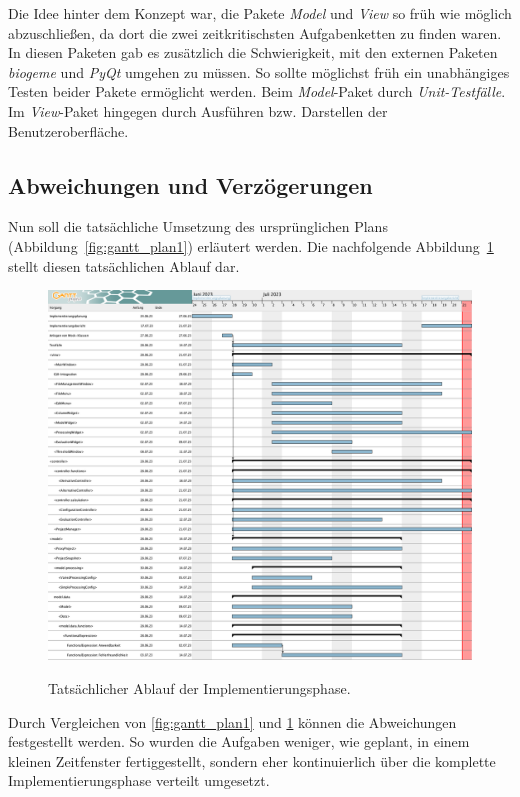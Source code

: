 \documentclass{article}
\begin{document}
Die Idee hinter dem Konzept war, die Pakete \emph{Model} und \emph{View} so früh wie möglich abzuschließen, da dort die zwei zeitkritischsten Aufgabenketten zu finden waren. In diesen Paketen gab es zusätzlich die Schwierigkeit, mit den externen Paketen \emph{\gls{biogeme}} und \emph{\gls{PyQt}} umgehen zu müssen. So sollte möglichst früh ein unabhängiges Testen beider Pakete ermöglicht werden. Beim \emph{Model}-Paket durch \emph{Unit-Testfälle}. Im \emph{View}-Paket hingegen durch Ausführen bzw. Darstellen der Benutzeroberfläche.

\subsection{Abweichungen und Verzögerungen}

Nun soll die tatsächliche Umsetzung des ursprünglichen Plans (Abbildung~\ref{fig:gantt_plan1}) erläutert werden. Die nachfolgende Abbildung~\ref{fig:gantt_real} stellt diesen tatsächlichen Ablauf dar.

\begin{figure}[H]%
    \centering
    \includegraphics[width=12cm]{img/gantt_real.png}
    \label{fig:gantt_real}
    \caption{Tatsächlicher Ablauf der Implementierungsphase.}
\end{figure}

Durch Vergleichen von \ref{fig:gantt_plan1} und \ref{fig:gantt_real} können die Abweichungen festgestellt werden. So wurden die Aufgaben weniger, wie geplant, in einem kleinen Zeitfenster fertiggestellt, sondern eher kontinuierlich über die komplette Implementierungsphase verteilt umgesetzt.\\
\end{document}
